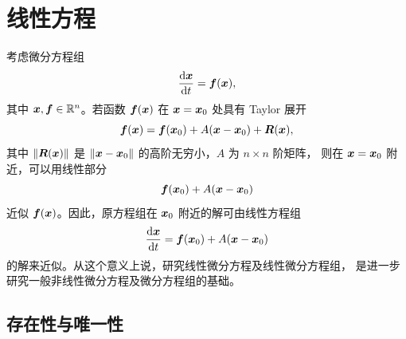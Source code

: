 \setchapterintro{}
\chapter{线性方程}\label{chap:线性方程}

考虑微分方程组
\[
	\dfrac{\mathrm{d} \boldsymbol{x}}{\mathrm{d} t}=\boldsymbol{f}(\boldsymbol{x}),
\]
其中 $\boldsymbol{x},\boldsymbol{f}\in\mathbb{R}^n$。若函数 $\boldsymbol{f}(\boldsymbol{x})$ 在
$\boldsymbol{x}=\boldsymbol{x}_0$ 处具有 Taylor 展开
\[
	\boldsymbol{f}(\boldsymbol{x})
	=\boldsymbol{f}(\boldsymbol{x}_0)
	+A(\boldsymbol{x}-\boldsymbol{x}_0)
	+\boldsymbol{R}(\boldsymbol{x}),
\]
其中 $\left\| \boldsymbol{R}(\boldsymbol{x}) \right\|$ 是
$\left\| \boldsymbol{x}-\boldsymbol{x}_0 \right\|$ 的高阶无穷小，$A$ 为 $n\times n$ 阶矩阵，
则在 $\boldsymbol{x}=\boldsymbol{x}_0$ 附近，可以用线性部分
\[
	\boldsymbol{f}(\boldsymbol{x}_0)+A(\boldsymbol{x}-\boldsymbol{x}_0)
\]
近似 $\boldsymbol{f}(\boldsymbol{x})$。因此，原方程组在 $\boldsymbol{x}_0$ 附近的解可由线性方程组
\[
	\dfrac{\mathrm{d} \boldsymbol{x}}{\mathrm{d} t}
	=\boldsymbol{f}(\boldsymbol{x}_0)+A(\boldsymbol{x}-\boldsymbol{x}_0)
\]
的解来近似。从这个意义上说，研究线性微分方程及线性微分方程组，
是进一步研究一般非线性微分方程及微分方程组的基础。

\section{存在性与唯一性}\label{sec:线性方程组的存在性与唯一性}

